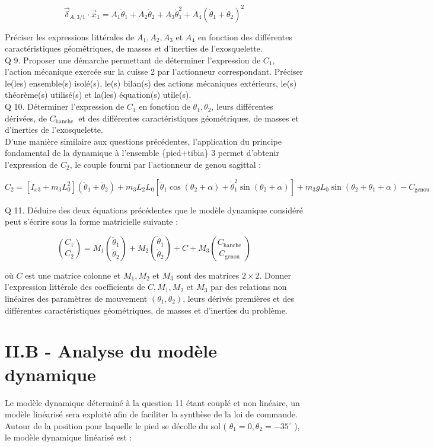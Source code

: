 \documentclass[10pt]{article}
\begin{document}
$$
\vec{\delta}_{A, 3 / 1} \cdot \vec{x}_{1}=A_{1} \ddot{\theta}_{1}+A_{2} \ddot{\theta}_{2}+A_{3} \dot{\theta}_{1}^{2}+A_{4}\left(\dot{\theta}_{1}+\dot{\theta}_{2}\right)^{2}
$$

Préciser les expressions littérales de $A_{1}, A_{2}, A_{3}$ et $A_{4}$ en fonction des différentes caractéristiques géométriques, de masses et d'inerties de l'exosquelette.\\
Q 9. Proposer une démarche permettant de déterminer l'expression de $C_{1}$, l'action mécanique exercée sur la cuisse 2 par l'actionneur correspondant. Préciser le(les) ensemble(s) isolé(s), le(s) bilan(s) des actions mécaniques extérieurs, le(s) théorème(s) utilisé(s) et la(les) équation(s) utile(s).\\
Q 10. Déterminer l'expression de $C_{1}$ en fonction de $\theta_{1}, \theta_{2}$, leurs différentes dérivées, de $C_{\text {hanche }}$ et des différentes caractéristiques géométriques, de masses et d'inerties de l'exosquelette.\\
D'une manière similaire aux questions précédentes, l'application du principe fondamental de la dynamique à l'ensemble \{pied+tibia\} 3 permet d'obtenir l'expression de $C_{2}$, le couple fourni par l'actionneur de genou sagittal :

$$
C_{2}=\left[I_{x 3}+m_{3} L_{0}^{2}\right]\left(\ddot{\theta}_{1}+\ddot{\theta}_{2}\right)+m_{3} L_{2} L_{0}\left[\ddot{\theta}_{1} \cos \left(\theta_{2}+\alpha\right)+\dot{\theta}_{1}^{2} \sin \left(\theta_{2}+\alpha\right)\right]+m_{3} g L_{0} \sin \left(\theta_{2}+\theta_{1}+\alpha\right)-C_{\text {genou }}
$$

Q 11. Déduire des deux équations précédentes que le modèle dynamique considéré peut s'écrire sous la forme matricielle suivante :

$$
\binom{C_{1}}{C_{2}}=M_{1}\binom{\ddot{\theta}_{1}}{\ddot{\theta}_{2}}+M_{2}\binom{\dot{\theta}_{1}}{\dot{\theta}_{2}}+C+M_{3}\binom{C_{\text {hanche }}}{C_{\text {genou }}}
$$

où $C$ est une matrice colonne et $M_{1}, M_{2}$ et $M_{3}$ sont des matrices $2 \times 2$. Donner l'expression littérale des coefficients de $C, M_{1}, M_{2}$ et $M_{3}$ par des relations non linéaires des paramètres de mouvement $\left(\theta_{1}, \theta_{2}\right)$, leurs dérivés premières et des différentes caractéristiques géométriques, de masses et d'inerties du problème.

\section*{II.B - Analyse du modèle dynamique}
Le modèle dynamique déterminé à la question 11 étant couplé et non linéaire, un modèle linéarisé sera exploité afin de faciliter la synthèse de la loi de commande.\\
Autour de la position pour laquelle le pied se décolle du sol ( $\theta_{1}=0, \theta_{2}=-35^{\circ}$ ), le modèle dynamique linéarisé est :
\end{document}
